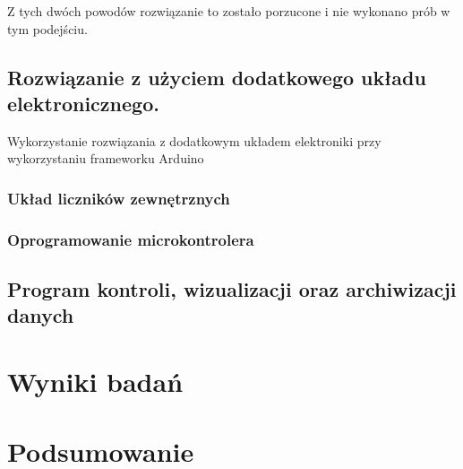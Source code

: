 \documentclass[a4paper,12pt]{article}
\begin{document}
Z tych dwóch powodów rozwiązanie to zostało porzucone i nie wykonano prób w tym podejściu. 


\subsection{Rozwiązanie z użyciem dodatkowego układu elektronicznego.}

Wykorzystanie rozwiązania z dodatkowym układem elektroniki przy wykorzystaniu frameworku Arduino

\subsubsection{Układ liczników zewnętrznych}
\subsubsection{Oprogramowanie microkontrolera}
\subsection{Program kontroli, wizualizacji oraz archiwizacji danych}

\section{Wyniki badań}

\section{Podsumowanie}
\end{document}
